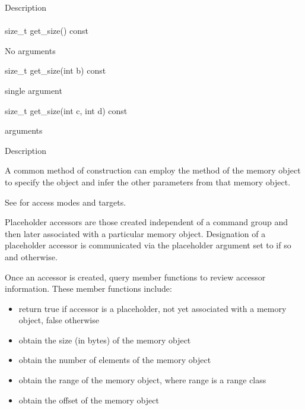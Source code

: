 \documentclass[letterpaper,10pt,english]{sphinxmanual}
\begin{document}
Description


\paragraph{}
\label{\detokenize{programming-interface/data/accessor:get-count}}\begin{sphinxalltt}
size\_t get\_size() const \begin{footnote}[1]\sphinxAtStartFootnote
No arguments
\end{footnote}
size\_t get\_size(int b) const \begin{footnote}[2]\sphinxAtStartFootnote
single argument
\end{footnote}
size\_t get\_size(int c, int d) const \begin{footnote}[3] arguments
\end{footnote}
\end{sphinxalltt}

Description

A common method of construction can employ the  method of
the memory object to specify the object and infer the other parameters
from that memory object.

See {\hyperref[\detokenize{programming-model/accessors:accessors}]{}} for access modes and targets.

Placeholder accessors are those created independent of a command group
and then later associated with a particular memory object. Designation
of a placeholder accessor is communicated via the placeholder argument
set to  if so and
 otherwise.

Once an accessor is created, query member functions to review accessor
information. These member functions include:
\begin{itemize}
\item {} 
 \textendash{} return true if accessor is a placeholder, not
yet associated with a memory object, false otherwise

\item {} 
 \textendash{} obtain the size (in bytes) of the memory object

\item {} 
 \textendash{} obtain the number of elements of the memory object

\item {} 
 \textendash{} obtain the range of the memory object, where range is
a range class

\item {} 
 \textendash{} obtain the offset of the memory object

\end{itemize}
\end{document}
